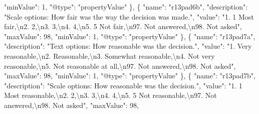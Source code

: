 \documentclass[
]{book}
\newenvironment{Shaded}{\begin{snugshade}}{\end{snugshade}}
\newcommand{\CharTok}[1]{\textcolor[rgb]{0.31,0.60,0.02}{#1}}
\newcommand{\DataTypeTok}[1]{\textcolor[rgb]{0.13,0.29,0.53}{#1}}
\newcommand{\DecValTok}[1]{\textcolor[rgb]{0.00,0.00,0.81}{#1}}
\newcommand{\FunctionTok}[1]{\textcolor[rgb]{0.00,0.00,0.00}{#1}}
\newcommand{\OtherTok}[1]{\textcolor[rgb]{0.56,0.35,0.01}{#1}}
\newcommand{\StringTok}[1]{\textcolor[rgb]{0.31,0.60,0.02}{#1}}
\begin{document}
\begin{Shaded}
\begin{Highlighting}[]
      \DataTypeTok{"minValue"}\FunctionTok{:} \DecValTok{1}\FunctionTok{,}
      \DataTypeTok{"@type"}\FunctionTok{:} \StringTok{"propertyValue"}
    \FunctionTok{\}}\OtherTok{,}
    \FunctionTok{\{}
      \DataTypeTok{"name"}\FunctionTok{:} \StringTok{"r13pad6b"}\FunctionTok{,}
      \DataTypeTok{"description"}\FunctionTok{:} \StringTok{"Scale options: How fair was the way the decision was made."}\FunctionTok{,}
      \DataTypeTok{"value"}\FunctionTok{:} \StringTok{"1. 1 Most fair,}\CharTok{\textbackslash{}n}\StringTok{2. 2,}\CharTok{\textbackslash{}n}\StringTok{3. 3,}\CharTok{\textbackslash{}n}\StringTok{4. 4,}\CharTok{\textbackslash{}n}\StringTok{5. 5 Not fair,}\CharTok{\textbackslash{}n}\StringTok{97. Not answered,}\CharTok{\textbackslash{}n}\StringTok{98. Not asked"}\FunctionTok{,}
      \DataTypeTok{"maxValue"}\FunctionTok{:} \DecValTok{98}\FunctionTok{,}
      \DataTypeTok{"minValue"}\FunctionTok{:} \DecValTok{1}\FunctionTok{,}
      \DataTypeTok{"@type"}\FunctionTok{:} \StringTok{"propertyValue"}
    \FunctionTok{\}}\OtherTok{,}
    \FunctionTok{\{}
      \DataTypeTok{"name"}\FunctionTok{:} \StringTok{"r13pad7a"}\FunctionTok{,}
      \DataTypeTok{"description"}\FunctionTok{:} \StringTok{"Text options: How reasonable was the decision."}\FunctionTok{,}
      \DataTypeTok{"value"}\FunctionTok{:} \StringTok{"1. Very reasonable,}\CharTok{\textbackslash{}n}\StringTok{2. Reasonable,}\CharTok{\textbackslash{}n}\StringTok{3. Somewhat reasonable,}\CharTok{\textbackslash{}n}\StringTok{4. Not very reasonable,}\CharTok{\textbackslash{}n}\StringTok{5. Not reasonable at all,}\CharTok{\textbackslash{}n}\StringTok{97. Not answered,}\CharTok{\textbackslash{}n}\StringTok{98. Not asked"}\FunctionTok{,}
      \DataTypeTok{"maxValue"}\FunctionTok{:} \DecValTok{98}\FunctionTok{,}
      \DataTypeTok{"minValue"}\FunctionTok{:} \DecValTok{1}\FunctionTok{,}
      \DataTypeTok{"@type"}\FunctionTok{:} \StringTok{"propertyValue"}
    \FunctionTok{\}}\OtherTok{,}
    \FunctionTok{\{}
      \DataTypeTok{"name"}\FunctionTok{:} \StringTok{"r13pad7b"}\FunctionTok{,}
      \DataTypeTok{"description"}\FunctionTok{:} \StringTok{"Scale options: How reasonable was the decision."}\FunctionTok{,}
      \DataTypeTok{"value"}\FunctionTok{:} \StringTok{"1. 1 Most reasonable,}\CharTok{\textbackslash{}n}\StringTok{2. 2,}\CharTok{\textbackslash{}n}\StringTok{3. 3,}\CharTok{\textbackslash{}n}\StringTok{4. 4,}\CharTok{\textbackslash{}n}\StringTok{5. 5 Not reasonable,}\CharTok{\textbackslash{}n}\StringTok{97. Not answered,}\CharTok{\textbackslash{}n}\StringTok{98. Not asked"}\FunctionTok{,}
      \DataTypeTok{"maxValue"}\FunctionTok{:} \DecValTok{98}\FunctionTok{,}

\end{Highlighting}
\end{Shaded}
\end{document}
